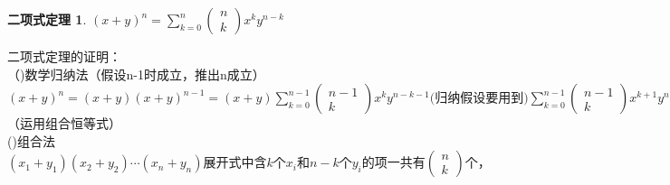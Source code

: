 \documentclass{book}%
\newtheorem{erxiangshi}{二项式定理}
\begin{document}
	\begin{erxiangshi}
		$\displaystyle (x+y)^{n}=\sum_{k=0}^{n}\begin{pmatrix}n\\k\end{pmatrix}x^ky^{n-k}$
	\end{erxiangshi}
	二项式定理的证明：\\
	（)数学归纳法（假设n-1时成立，推出n成立）\\
	$(x+y)^{n}=(x+y)(x+y)^{n-1}=(x+y)\displaystyle{\sum_{k=0}^{n-1}\begin{pmatrix}n-1\\k\end{pmatrix}x^{k}y^{n-k-1}}\text{(归纳假设要用到)}\sum_{k=0}^{n-1}\begin{pmatrix}n-1\\k\end{pmatrix}x^{k+1}y^{n-k-1}+\sum_{k=0}^{n-1}\begin{pmatrix}n-1\\k\end{pmatrix}x^{k}y^{n-k}=\sum_{i=1}^{n}\begin{pmatrix}n-1\\i-1\end{pmatrix}x^{i}y^{n-i}(i=k+1)+\sum_{i=0}^{n-1}\begin{pmatrix}n-1\\i\end{pmatrix}x^{i}y^{n-i}(i=k)=\sum_{i=0}^{n}\begin{pmatrix}n\\i\end{pmatrix}(i=i-1)x^{i}y^{n-i}-\sum_{i=0}^{n}\begin{pmatrix}n-1\\i\end{pmatrix}x^{i}y^{n-i}+\sum_{i=0}^{n-1}\begin{pmatrix}n-1\\i\end{pmatrix}x^{i}y^{n-i}=\sum_{i=0}^{n}\begin{pmatrix}n\\i\end{pmatrix}x^{i}y^{n-i}$（运用组合恒等式）\\
	()组合法\\
	$(x_{1}+y_{1})(x_{2}+y_{2})\cdots(x_{n}+y_{n})\text{展开式中含}k\text{个}x_{i}\text{和}n-k\text{个}y_{i}\text{的项一共有}\begin{pmatrix}n\\k\end{pmatrix}\text{个}\text{，}$
\end{document}
